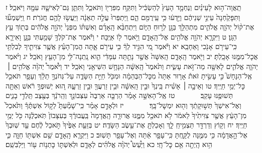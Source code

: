 \documentclass[twoside, openany, parskip=half, 11pt]{book}
\begin{document}
תַֽאֲוָה־ה֣וּא לָעֵינַ֗יִם וְנֶחְמָ֤ד הָעֵץ֙ לְהַשְׂכִּ֔יל וַתִּקַּ֥ח מִפִּרְי֖וֹ וַתֹּאכַ֑ל וַתִּתֵּ֧ן גַּם־לְאִישָׁ֛הּ עִמָּ֖הּ וַיֹּאכַֽל׃ ז וַתִּפָּקַ֙חְנָה֙ עֵינֵ֣י שְׁנֵיהֶ֔ם וַיֵּ֣דְע֔וּ כִּ֥י עֵֽירֻמִּ֖ם הֵ֑ם וַֽיִּתְפְּרוּ֙ עֲלֵ֣ה תְאֵנָ֔ה וַיַּעֲשׂ֥וּ לָהֶ֖ם חֲגֹרֹֽת׃ ח וַֽיִּשְׁמְע֞וּ אֶת־ק֨וֹל יְהֹוָ֧ה אֱלֹהִ֛ים מִתְהַלֵּ֥ךְ בַּגָּ֖ן לְר֣וּחַ הַיּ֑וֹם וַיִּתְחַבֵּ֨א הָֽאָדָ֜ם וְאִשְׁתּ֗וֹ מִפְּנֵי֙ יְהֹוָ֣ה אֱלֹהִ֔ים בְּת֖וֹךְ עֵ֥ץ הַגָּֽן׃ ט וַיִּקְרָ֛א יְהֹוָ֥ה אֱלֹהִ֖ים אֶל־הָֽאָדָ֑ם וַיֹּ֥אמֶר ל֖וֹ אַיֶּֽכָּה׃ י וַיֹּ֕אמֶר אֶת־קֹלְךָ֥ שָׁמַ֖עְתִּי בַּגָּ֑ן וָאִירָ֛א כִּֽי־עֵירֹ֥ם אָנֹ֖כִי וָאֵחָבֵֽא׃ יא וַיֹּ֕אמֶר מִ֚י הִגִּ֣יד לְךָ֔ כִּ֥י עֵירֹ֖ם אָ֑תָּה הֲמִן־הָעֵ֗ץ אֲשֶׁ֧ר צִוִּיתִ֛יךָ לְבִלְתִּ֥י אֲכׇל־מִמֶּ֖נּוּ אָכָֽלְתָּ׃ יב וַיֹּ֖אמֶר הָֽאָדָ֑ם הָֽאִשָּׁה֙ אֲשֶׁ֣ר נָתַ֣תָּה עִמָּדִ֔י הִ֛וא נָֽתְנָה־לִּ֥י מִן־הָעֵ֖ץ וָאֹכֵֽל׃ יג וַיֹּ֨אמֶר יְהֹוָ֧ה אֱלֹהִ֛ים לָאִשָּׁ֖ה מַה־זֹּ֣את עָשִׂ֑ית וַתֹּ֙אמֶר֙ הָֽאִשָּׁ֔ה הַנָּחָ֥שׁ הִשִּׁיאַ֖נִי וָאֹכֵֽל׃ יד וַיֹּ֩אמֶר֩ יְהֹוָ֨ה אֱלֹהִ֥ים ׀ אֶֽל־הַנָּחָשׁ֮ כִּ֣י עָשִׂ֣יתָ זֹּאת֒ אָר֤וּר אַתָּה֙ מִכׇּל־הַבְּהֵמָ֔ה וּמִכֹּ֖ל חַיַּ֣ת הַשָּׂדֶ֑ה עַל־גְּחֹנְךָ֣ תֵלֵ֔ךְ וְעָפָ֥ר תֹּאכַ֖ל כׇּל־יְמֵ֥י חַיֶּֽיךָ׃ טו וְאֵיבָ֣ה ׀ אָשִׁ֗ית בֵּֽינְךָ֙ וּבֵ֣ין הָֽאִשָּׁ֔ה וּבֵ֥ין זַרְעֲךָ֖ וּבֵ֣ין זַרְעָ֑הּ ה֚וּא יְשׁוּפְךָ֣ רֹ֔אשׁ וְאַתָּ֖ה תְּשׁוּפֶ֥נּוּ עָקֵֽב׃
　　　 טז אֶֽל־הָאִשָּׁ֣ה אָמַ֗ר הַרְבָּ֤ה אַרְבֶּה֙ עִצְּבוֹנֵ֣ךְ וְהֵֽרֹנֵ֔ךְ בְּעֶ֖צֶב תֵּֽלְדִ֣י בָנִ֑ים וְאֶל־אִישֵׁךְ֙ תְּשׁ֣וּקָתֵ֔ךְ וְה֖וּא יִמְשׇׁל־בָּֽךְ׃
　　　 יז וּלְאָדָ֣ם אָמַ֗ר כִּֽי־שָׁמַ֘עְתָּ֮ לְק֣וֹל אִשְׁתֶּ֒ךָ֒ וַתֹּ֙אכַל֙ מִן־הָעֵ֔ץ אֲשֶׁ֤ר צִוִּיתִ֙יךָ֙ לֵאמֹ֔ר לֹ֥א תֹאכַ֖ל מִמֶּ֑נּוּ אֲרוּרָ֤ה הָֽאֲדָמָה֙ בַּֽעֲבוּרֶ֔ךָ בְּעִצָּבוֹן֙ תֹּֽאכְלֶ֔נָּה כֹּ֖ל יְמֵ֥י חַיֶּֽיךָ׃ יח וְק֥וֹץ וְדַרְדַּ֖ר תַּצְמִ֣יחַֽ לָ֑ךְ וְאָכַלְתָּ֖ אֶת־עֵ֥שֶׂב הַשָּׂדֶֽה׃ יט בְּזֵעַ֤ת אַפֶּ֙יךָ֙ תֹּ֣אכַל לֶ֔חֶם עַ֤ד שֽׁוּבְךָ֙ אֶל־הָ֣אֲדָמָ֔ה כִּ֥י מִמֶּ֖נָּה לֻקָּ֑חְתָּ כִּֽי־עָפָ֣ר אַ֔תָּה וְאֶל־עָפָ֖ר תָּשֽׁוּב׃ כ וַיִּקְרָ֧א הָֽאָדָ֛ם שֵׁ֥ם אִשְׁתּ֖וֹ חַוָּ֑ה כִּ֛י הִ֥וא הָֽיְתָ֖ה אֵ֥ם כׇּל־חָֽי׃ כא וַיַּ֩עַשׂ֩ יְהֹוָ֨ה אֱלֹהִ֜ים לְאָדָ֧ם וּלְאִשְׁתּ֛וֹ כׇּתְנ֥וֹת ע֖וֹר וַיַּלְבִּשֵֽׁם׃
\end{document}
